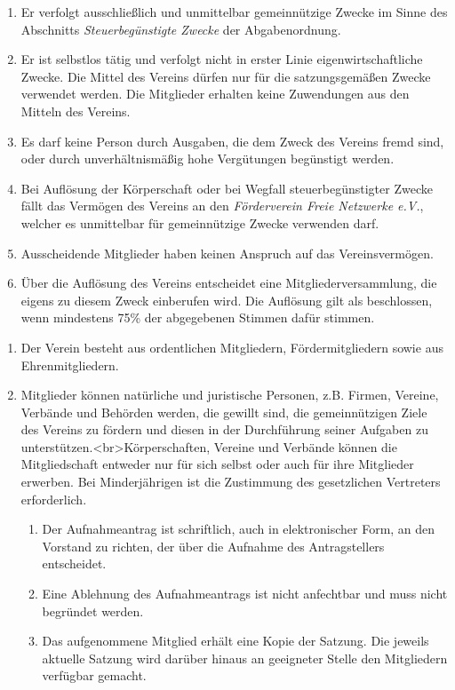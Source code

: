 \documentclass[parskip=half]{scrartcl}
\begin{document}
\begin{contract}
\begin{enumerate}
			\item Er verfolgt ausschließlich und unmittelbar gemeinnützige Zwecke im Sinne des Abschnitts \textit{Steuerbegünstigte Zwecke} der Abgabenordnung.
			\item Er ist selbstlos tätig und verfolgt nicht in erster Linie eigenwirtschaftliche Zwecke. Die Mittel des Vereins dürfen nur für die satzungsgemäßen Zwecke verwendet werden. Die Mitglieder erhalten keine Zuwendungen aus den Mitteln des Vereins.
			\item Es darf keine Person durch Ausgaben, die dem Zweck des Vereins fremd sind, oder durch unverhältnismäßig hohe Vergütungen begünstigt werden.
			\item Bei Auflösung der Körperschaft oder bei Wegfall steuerbegünstigter Zwecke fällt das Vermögen des Vereins an den \textit{Förderverein Freie Netzwerke e.V.}, welcher es unmittelbar für gemeinnützige Zwecke verwenden darf.
			\item Ausscheidende Mitglieder haben keinen Anspruch auf das Vereinsvermögen.
			\item Über die Auflösung des Vereins entscheidet eine Mitgliederversammlung, die eigens zu diesem Zweck einberufen wird. Die Auflösung gilt als beschlossen, wenn mindestens 75\% der abgegebenen Stimmen dafür stimmen.
		\end{enumerate}
		\begin{enumerate}
			\item Der Verein besteht aus ordentlichen Mitgliedern, Fördermitgliedern sowie aus Ehrenmitgliedern.
			\item Mitglieder können natürliche und juristische Personen, z.B. Firmen, Vereine, Verbände und Behörden werden, die gewillt sind, die gemeinnützigen Ziele des Vereins zu fördern und diesen in der Durchführung seiner Aufgaben zu unterstützen.<br>Körperschaften, Vereine und Verbände können die Mitgliedschaft entweder nur für sich selbst oder auch für ihre Mitglieder erwerben. Bei Minderjährigen ist die Zustimmung des gesetzlichen Vertreters erforderlich.
			\begin{enumerate}
				\item Der Aufnahmeantrag ist schriftlich, auch in elektronischer Form, an den Vorstand zu richten, der über die Aufnahme des Antragstellers entscheidet.
				\item Eine Ablehnung des Aufnahmeantrags ist nicht anfechtbar und muss nicht begründet werden.
				\item Das aufgenommene Mitglied erhält eine Kopie der Satzung. Die jeweils aktuelle Satzung wird darüber hinaus an geeigneter Stelle den Mitgliedern verfügbar gemacht.

\end{enumerate}
\end{enumerate}
\end{contract}
\end{document}
